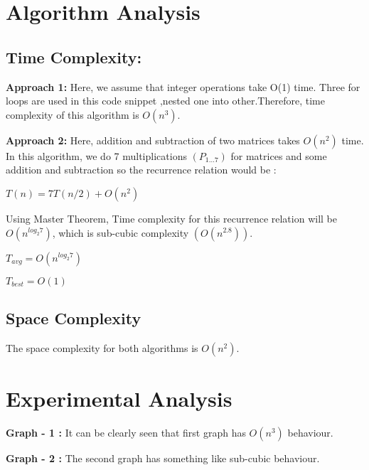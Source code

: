 \documentclass[conference]{IEEEtran}
\begin{document}
\section{Algorithm Analysis}
\subsection{Time Complexity:}

\textbf{Approach 1:} 
Here, we assume that integer operations take O(1) time. Three for loops are used in this code snippet ,nested one into other.Therefore, time complexity of this algorithm is $O(n^3)$.


\textbf{Approach 2:} 
Here, addition and subtraction of two matrices takes $O(n^2)$ time.
In this algorithm, we do 7 multiplications $(P_{1\dots7})$ for matrices and some addition and subtraction so the recurrence relation would be :

$T(n)=7T(n/2)+ O(n^2)$

Using Master Theorem, Time complexity for this recurrence relation will be $O(n^{log_2{7}})$, which is sub-cubic complexity $(O(n^{2.8}))$.

$T_{avg} = O(n^{log_2{7}})$

$T_{best} = O(1)$

\subsection{Space Complexity}
The space complexity for both algorithms is $O(n^2)$.

\section{Experimental Analysis}


\textbf{Graph - 1 : } It can be clearly seen that first graph has $O(n^3)$ behaviour.

\textbf{Graph - 2 : } The second graph has something like sub-cubic behaviour.




\end{document}
